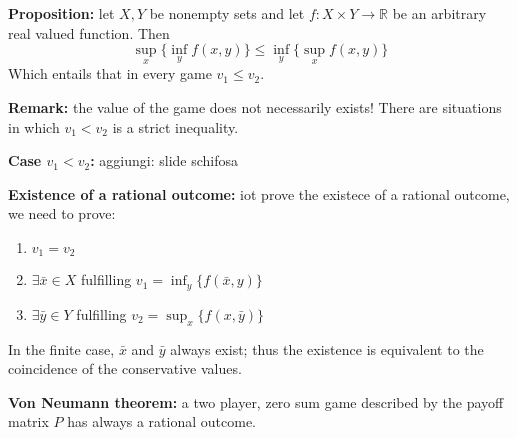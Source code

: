 \bigskip
\noindent \textbf{Proposition:} let $X,Y$ be nonempty sets and let 
$f: X \times Y \rightarrow \mathbb{R}$ be an arbitrary real valued function. 
Then
\[
	\sup_x \{ \inf_y f(x,y)\} \leq \inf_y \{ \sup_x f(x,y)\}
\]
Which entails that in every game $v_1 \leq v_2$.

\noindent \textbf{Remark:} the value of the game does not necessarily exists! 
There are situations in which $v_1 < v_2$ is a strict inequality.

\bigskip
\noindent \textbf{Case $v_1 < v_2$:} {\huge aggiungi: slide schifosa}

\bigskip
\noindent \textbf{Existence of a rational outcome:} iot prove the existece of 
a rational outcome, we need to prove:
\begin{enumerate}
	\item $v_1 = v_2$
	\item $\exists \bar{x} \in X$ fulfilling $v_1 = \inf_y\{f(\bar{x},y)\}$
	\item $\exists \bar{y} \in Y$ fulfilling $v_2 = \sup_x\{f(x,\bar{y})\}$
\end{enumerate}
In the finite case, $\bar{x}$ and $\bar{y}$ always exist; thus the existence is 
equivalent to the coincidence of the conservative values.

\bigskip
\noindent \textbf{Von Neumann theorem:} a two player, zero sum game described by 
the payoff matrix $P$ has always a rational outcome.

%